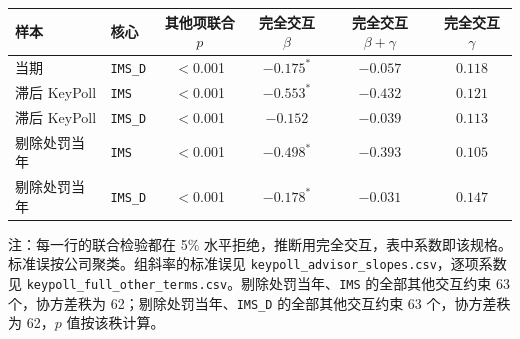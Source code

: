 \begin{center}
\begin{threeparttable}
\caption{附录：\texttt{IMS\_D}、滞后身份与剔除处罚当年}
\label{tab:keypoll-advisor-appendix}
\begin{tabular}{llcccc}
\toprule
样本 & 核心 & 其他项联合 $p$ & 完全交互 \(\beta\) & 完全交互 \(\beta+\gamma\) & 完全交互 \(\gamma\) \\
\midrule
当期 & \texttt{IMS\_D} & $<$0.001 & $-0.175^{*}$ & $-0.057$ & $0.118$ \\
滞后 KeyPoll & \texttt{IMS} & $<$0.001 & $-0.553^{*}$ & $-0.432$ & $0.121$ \\
滞后 KeyPoll & \texttt{IMS\_D} & $<$0.001 & $-0.152$ & $-0.039$ & $0.113$ \\
剔除处罚当年 & \texttt{IMS} & $<$0.001 & $-0.498^{*}$ & $-0.393$ & $0.105$ \\
剔除处罚当年 & \texttt{IMS\_D} & $<$0.001 & $-0.178^{*}$ & $-0.031$ & $0.147$ \\
\bottomrule
\end{tabular}
\begin{tablenotes}\footnotesize
\item 注：每一行的联合检验都在 5\% 水平拒绝，推断用完全交互，表中系数即该规格。标准误按公司聚类。组斜率的标准误见 \texttt{keypoll\_advisor\_slopes.csv}，逐项系数见 \texttt{keypoll\_full\_other\_terms.csv}。剔除处罚当年、\texttt{IMS} 的全部其他交互约束 63 个，协方差秩为 62；剔除处罚当年、\texttt{IMS\_D} 的全部其他交互约束 63 个，协方差秩为 62，$p$ 值按该秩计算。
\end{tablenotes}
\end{threeparttable}
\end{center}
